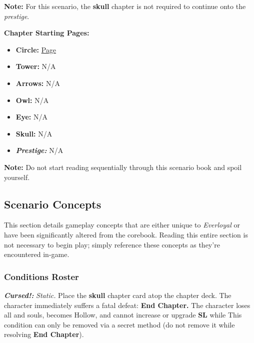 \documentclass[12pt]{article}
\begin{document}
\begin{multicols*}{2}
\begin{tcolorbox}
\textbf{Note:} For this scenario, the \textbf{skull} chapter is not required to continue onto the \emph{prestige}.
\end{tcolorbox}

\textbf{Chapter Starting Pages:}
\begin{itemize}
\item \textbf{Circle:} \hyperlink{c11}{Page \pageref{c11}}
\item \textbf{Tower:} N/A %
\item \textbf{Arrows:} N/A %
\item \textbf{Owl:} N/A %
\item \textbf{Eye:} N/A %
\item \textbf{Skull:} N/A %
\item \textbf{\emph{Prestige:}} N/A %
\end{itemize}

\begin{tcolorbox}
\textbf{Note:} Do not start reading sequentially through this scenario book and spoil yourself.
\end{tcolorbox}

\vspace*{\fill}
\pagebreak

\subsection{Scenario Concepts}
This section details gameplay concepts that are either unique to \emph{Everloyal} or have been significantly altered from the corebook. Reading this entire section is not necessary to begin play; simply reference these concepts as they’re encountered in-game.

\subsubsection{Conditions Roster}
\textbf{\emph{Cursed!:}} \hypertarget{Cursed!}{}\emph{Static.} Place the \textbf{skull} chapter card atop the chapter deck. The character immediately suffers a fatal defeat: \textbf{End Chapter.} The character loses all  and souls, becomes Hollow, and cannot increase  or upgrade \textbf{SL} while  This condition can only be removed via a secret method (do not remove it while resolving \textbf{End Chapter}).\\


\end{multicols*}
\end{document}
